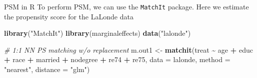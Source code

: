 \documentclass[
  ignorenonframetext,
  aspectratio=169, handout]{beamer}
\newenvironment{Shaded}{\begin{snugshade}}{\end{snugshade}}
\newcommand{\AttributeTok}[1]{\textcolor[rgb]{0.13,0.29,0.53}{#1}}
\newcommand{\CommentTok}[1]{\textcolor[rgb]{0.56,0.35,0.01}{\textit{#1}}}
\newcommand{\FunctionTok}[1]{\textcolor[rgb]{0.13,0.29,0.53}{\textbf{#1}}}
\newcommand{\NormalTok}[1]{#1}
\newcommand{\OtherTok}[1]{\textcolor[rgb]{0.56,0.35,0.01}{#1}}
\newcommand{\SpecialCharTok}[1]{\textcolor[rgb]{0.81,0.36,0.00}{\textbf{#1}}}
\newcommand{\StringTok}[1]{\textcolor[rgb]{0.31,0.60,0.02}{#1}}
\begin{document}
\begin{frame}[fragile]{PSM in R}
\protect\hypertarget{psm-in-r}{}
To perform PSM, we can use the \texttt{MatchIt} package. Here we
estimate the propensity score for the LaLonde data

\footnotesize

\begin{Shaded}
\begin{Highlighting}[]
\FunctionTok{library}\NormalTok{(}\StringTok{"MatchIt"}\NormalTok{)}
\FunctionTok{library}\NormalTok{(}\StringTok{\textquotesingle{}marginaleffects\textquotesingle{}}\NormalTok{)}
\FunctionTok{data}\NormalTok{(}\StringTok{"lalonde"}\NormalTok{)}

\CommentTok{\# 1:1 NN PS matching w/o replacement}
\NormalTok{m.out1 }\OtherTok{\textless{}{-}} \FunctionTok{matchit}\NormalTok{(treat }\SpecialCharTok{\textasciitilde{}}\NormalTok{ age }\SpecialCharTok{+}\NormalTok{ educ }\SpecialCharTok{+}\NormalTok{ race }\SpecialCharTok{+}\NormalTok{ married }\SpecialCharTok{+} 
\NormalTok{                   nodegree }\SpecialCharTok{+}\NormalTok{ re74 }\SpecialCharTok{+}\NormalTok{ re75, }\AttributeTok{data =}\NormalTok{ lalonde,}
                 \AttributeTok{method =} \StringTok{"nearest"}\NormalTok{, }\AttributeTok{distance =} \StringTok{"glm"}\NormalTok{)}
\end{Highlighting}
\end{Shaded}
\end{frame}
\end{document}
